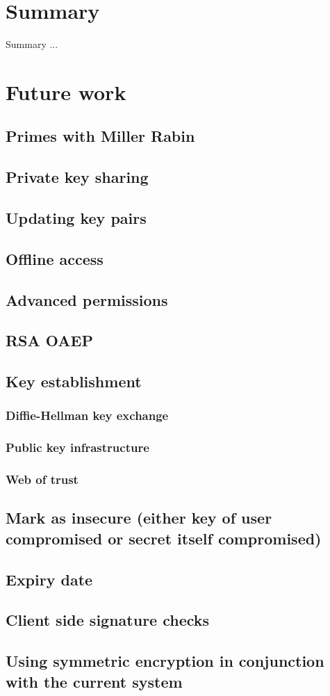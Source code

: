 \chapter{Summary}

Summary ...

\chapter{Future work}

\section{Primes with Miller Rabin}
\section{Private key sharing}
\section{Updating key pairs}
\section{Offline access}
\section{Advanced permissions}
\section{RSA OAEP}
\section{Key establishment}
\subsection{Diffie-Hellman key exchange}
\subsection{Public key infrastructure}
\subsection{Web of trust}
\section{Mark as insecure (either key of user compromised or secret itself compromised)}
\section{Expiry date}
\section{Client side signature checks}
\section{Using symmetric encryption in conjunction with the current system}
